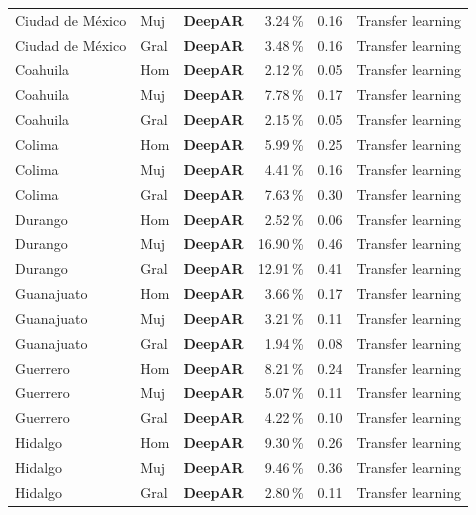 \documentclass[12pt, letterpaper]{article}
\begin{document}
\begin{longtable}{l l >{\bfseries}c r r l}
Ciudad de México & Muj & \textcolor{cdeepar}{\textbf{DeepAR}} & 3.24\,\% & 0.16 & Transfer learning \\
Ciudad de México & Gral & \textcolor{cdeepar}{\textbf{DeepAR}} & 3.48\,\% & 0.16 & Transfer learning \\
Coahuila & Hom & \textcolor{cdeepar}{\textbf{DeepAR}} & 2.12\,\% & 0.05 & Transfer learning \\
Coahuila & Muj & \textcolor{cdeepar}{\textbf{DeepAR}} & 7.78\,\% & 0.17 & Transfer learning \\
Coahuila & Gral & \textcolor{cdeepar}{\textbf{DeepAR}} & 2.15\,\% & 0.05 & Transfer learning \\
Colima & Hom & \textcolor{cdeepar}{\textbf{DeepAR}} & 5.99\,\% & 0.25 & Transfer learning \\
Colima & Muj & \textcolor{cdeepar}{\textbf{DeepAR}} & 4.41\,\% & 0.16 & Transfer learning \\
Colima & Gral & \textcolor{cdeepar}{\textbf{DeepAR}} & 7.63\,\% & 0.30 & Transfer learning \\
Durango & Hom & \textcolor{cdeepar}{\textbf{DeepAR}} & 2.52\,\% & 0.06 & Transfer learning \\
Durango & Muj & \textcolor{cdeepar}{\textbf{DeepAR}} & 16.90\,\% & 0.46 & Transfer learning \\
Durango & Gral & \textcolor{cdeepar}{\textbf{DeepAR}} & 12.91\,\% & 0.41 & Transfer learning \\
Guanajuato & Hom & \textcolor{cdeepar}{\textbf{DeepAR}} & 3.66\,\% & 0.17 & Transfer learning \\
Guanajuato & Muj & \textcolor{cdeepar}{\textbf{DeepAR}} & 3.21\,\% & 0.11 & Transfer learning \\
Guanajuato & Gral & \textcolor{cdeepar}{\textbf{DeepAR}} & 1.94\,\% & 0.08 & Transfer learning \\
Guerrero & Hom & \textcolor{cdeepar}{\textbf{DeepAR}} & 8.21\,\% & 0.24 & Transfer learning \\
Guerrero & Muj & \textcolor{cdeepar}{\textbf{DeepAR}} & 5.07\,\% & 0.11 & Transfer learning \\
Guerrero & Gral & \textcolor{cdeepar}{\textbf{DeepAR}} & 4.22\,\% & 0.10 & Transfer learning \\
Hidalgo & Hom & \textcolor{cdeepar}{\textbf{DeepAR}} & 9.30\,\% & 0.26 & Transfer learning \\
Hidalgo & Muj & \textcolor{cdeepar}{\textbf{DeepAR}} & 9.46\,\% & 0.36 & Transfer learning \\
Hidalgo & Gral & \textcolor{cdeepar}{\textbf{DeepAR}} & 2.80\,\% & 0.11 & Transfer learning \\

\end{longtable}
\end{document}
